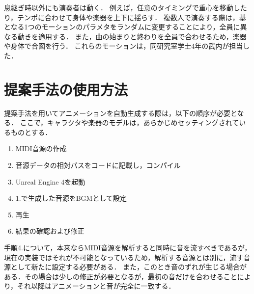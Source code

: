 \indent
息継ぎ時以外にも演奏者は動く．
例えば，任意のタイミングで重心を移動したり，テンポに合わせて身体や楽器を上下に揺らす．
複数人で演奏する際は，基となる1つのモーションのパラメタをランダムに変更することにより，全員に異なる動きを適用する．
また，曲の始まりと終わりを全員で合わせるため，楽器や身体で合図を行う．
これらのモーションは，同研究室学士4年の武内が担当した．

\section{提案手法の使用方法} \label{sec:howto}
提案手法を用いてアニメーションを自動生成する際は，以下の順序が必要となる．
ここで，キャラクタや楽器のモデルは，あらかじめセッティングされているものとする．
\begin{enumerate}
	\item MIDI音源の作成
	\item 音源データの相対パスをコードに記載し，コンパイル
	\item Unreal Engine 4を起動
	\item 1.で生成した音源をBGMとして設定
	\item 再生
	\item 結果の確認および修正
\end{enumerate}\par
手順4.について，本来ならMIDI音源を解析すると同時に音を流すべきであるが，現在の実装ではそれが不可能となっているため，解析する音源とは別に，流す音源として新たに設定する必要がある．
また，このとき音のずれが生じる場合がある．その場合は少しの修正が必要となるが，最初の音だけを合わせることにより，それ以降はアニメーションと音が完全に一致する．
